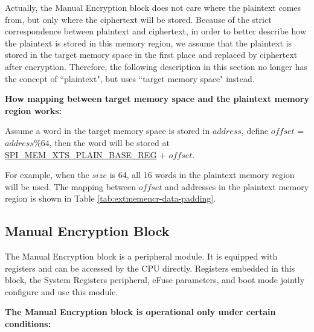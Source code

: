 \documentclass[main\_\_EN.tex]{subfiles}
\begin{document}
Actually, the Manual Encryption block does not care where the plaintext comes from, but only where the ciphertext will be stored. Because of the strict correspondence between plaintext and ciphertext, in order to better describe how the plaintext is stored in this memory region, we assume that the plaintext is stored in the target memory space in the first place and replaced by ciphertext after encryption. Therefore, the following description in this section no longer has the concept of ``plaintext", but uses ``target memory space" instead.

{\bfseries How mapping between target memory space and the plaintext memory region works:}

Assume a word in the target memory space is stored in \begin{math} address \end{math}, define \begin{math}offset\end{math} = \begin{math} address \% 64 \end{math}, then the word will be stored at \hyperref[regdesc:SPIMEMXTSPLAINBASEREG]{SPI\_MEM\_XTS\_PLAIN\_BASE\_REG} + \begin{math}offset\end{math}.

For example, when the \begin{math} size \end{math} is 64, all 16 words in the plaintext memory region will be used. The mapping between \begin{math}offset\end{math} and addresses in the plaintext memory region is shown in Table \ref{tab:extmemencr-data-padding}.



\subsection{Manual Encryption Block}

The Manual Encryption block is a peripheral module. It is equipped with registers and can be accessed by the CPU directly. Registers embedded in this block, the System Registers peripheral, eFuse parameters, and boot mode jointly configure and use this module.

\textbf{The Manual Encryption block is operational only under certain conditions:}
\end{document}
